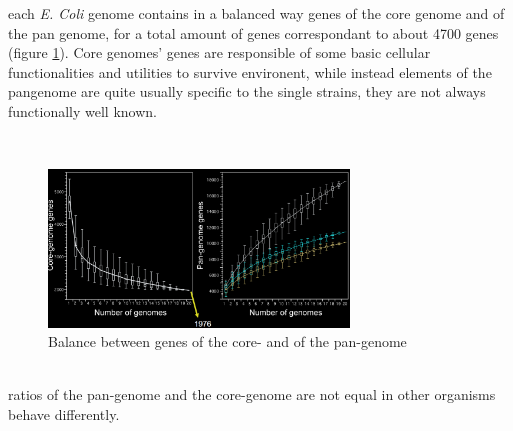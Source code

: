 each \emph{E. Coli} genome contains in a balanced way genes of the core genome and of the pan genome, for a total amount of genes correspondant to about 4700 genes (figure \ref{balancepancore}). Core genomes' genes are responsible of some basic cellular functionalities and utilities to survive environent, while instead elements of the pangenome are quite usually specific to the single strains, they are not always functionally well known. 

\\

\begin{figure}[h]
\caption{Balance between genes of the core- and of the pan-genome}\label{balancepancore}
\centering
\includegraphics[width=8cm]{corePanGenEcoli}
\end{figure}

\\


ratios of the pan-genome and the core-genome are not equal in other
organisms behave differently.